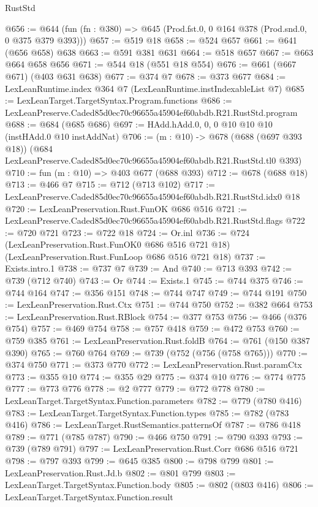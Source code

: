 \begin{lexlean}{RustStd}
\begin{coremodule}
@656 := @644 (fun (fn : @380) => @645 (Prod.fst.{0, 0} @164 @378 (Prod.snd.{0, 0} @375 @379 @393)))
@657 := @519 @18
@658 := @524 @657
@661 := @641 (@656 @658) @638
@663 := @591 @381 @631
@664 := @518 @657
@667 := @663 @664 @658 @656
@671 := @544 @18 (@551 @18 @554)
@676 := @661 (@667 @671) (@403 @631 @638)
@677 := @374 @7
@678 := @373 @677
@684 := LexLeanRuntime.index @364 @7 (LexLeanRuntime.instIndexableList @7)
@685 := LexLeanTarget.TargetSyntax.Program.functions
@686 := LexLeanPreserve.Caded85d0ec70c96655a45904ef60abdb.R21.RustStd.program
@688 := @684 (@685 @686)
@697 := HAdd.hAdd.{0, 0, 0} @10 @10 @10 (instHAdd.{0} @10 instAddNat)
@706 := (m : @10) ->
  @678
    (@688 (@697 @393 @18))
    (@684 LexLeanPreserve.Caded85d0ec70c96655a45904ef60abdb.R21.RustStd.tl0 @393)
@710 := fun (m : @10) => @403 @677 (@688 @393)
@712 := @678 (@688 @18)
@713 := @466 @7
@715 := @712 (@713 @102)
@717 := LexLeanPreserve.Caded85d0ec70c96655a45904ef60abdb.R21.RustStd.idx0 @18
@720 := LexLeanPreservation.Rust.FunOK @686 @516
@721 := LexLeanPreserve.Caded85d0ec70c96655a45904ef60abdb.R21.RustStd.flags
@722 := @720 @721
@723 := @722 @18
@724 := Or.inl
@736 := @724
    (LexLeanPreservation.Rust.FunOK0 @686 @516 @721 @18)
    (LexLeanPreservation.Rust.FunLoop @686 @516 @721 @18)
@737 := Exists.intro.{1}
@738 := @737 @7
@739 := And
@740 := @713 @393
@742 := @739 (@712 @740)
@743 := Or
@744 := Exists.{1}
@745 := @744 @375
@746 := @744 @164
@747 := @356 @151
@748 := @744 @747
@749 := @744 @191
@750 := LexLeanPreservation.Rust.Ctx
@751 := @744 @750
@752 := @382 @664
@753 := LexLeanPreservation.Rust.RBlock
@754 := @377 @753
@756 := @466 (@376 @754)
@757 := @469 @754
@758 := @757 @418
@759 := @472 @753
@760 := @759 @385
@761 := LexLeanPreservation.Rust.foldB
@764 := @761 (@150 @387 @390)
@765 := @760 @764
@769 := @739 (@752 (@756 (@758 @765)))
@770 := @374 @750
@771 := @373 @770
@772 := LexLeanPreservation.Rust.paramCtx
@773 := @355 @10
@774 := @355 @29
@775 := @374 @10
@776 := @774 @775
@777 := @773 @776
@778 := @2 @777
@779 := @772 @778
@780 := LexLeanTarget.TargetSyntax.Function.parameters
@782 := @779 (@780 @416)
@783 := LexLeanTarget.TargetSyntax.Function.types
@785 := @782 (@783 @416)
@786 := LexLeanTarget.RustSemantics.patternsOf
@787 := @786 @418
@789 := @771 (@785 @787)
@790 := @466 @750
@791 := @790 @393
@793 := @739 (@789 @791)
@797 := LexLeanPreservation.Rust.Corr @686 @516 @721
@798 := @797 @393
@799 := @645 @385
@800 := @798 @799
@801 := LexLeanPreservation.Rust.Jd.b
@802 := @801 @799
@803 := LexLeanTarget.TargetSyntax.Function.body
@805 := @802 (@803 @416)
@806 := LexLeanTarget.TargetSyntax.Function.result

\end{coremodule}
\end{lexlean}
